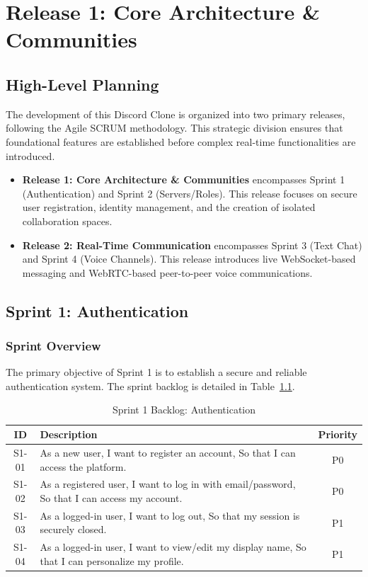 \chapter{Release 1: Core Architecture \& Communities}

\section*{High-Level Planning}
The development of this Discord Clone is organized into two primary releases, following the Agile SCRUM methodology. This strategic division ensures that foundational features are established before complex real-time functionalities are introduced. 
\begin{itemize}
    \item \textbf{Release 1: Core Architecture \& Communities} encompasses Sprint 1 (Authentication) and Sprint 2 (Servers/Roles). This release focuses on secure user registration, identity management, and the creation of isolated collaboration spaces.
    \item \textbf{Release 2: Real-Time Communication} encompasses Sprint 3 (Text Chat) and Sprint 4 (Voice Channels). This release introduces live WebSocket-based messaging and WebRTC-based peer-to-peer voice communications.
\end{itemize}

\section{Sprint 1: Authentication}

\subsection{Sprint Overview}
The primary objective of Sprint 1 is to establish a secure and reliable authentication system. The sprint backlog is detailed in Table~\ref{tab:sprint1_backlog}.

\begin{table}[H]
    \centering
    \begin{tabular}{|c|p{10cm}|c|}
        \hline
        \textbf{ID} & \textbf{Description} & \textbf{Priority} \\
        \hline
        S1-01 & As a new user, I want to register an account, So that I can access the platform. & P0 \\
        \hline
        S1-02 & As a registered user, I want to log in with email/password, So that I can access my account. & P0 \\
        \hline
        S1-03 & As a logged-in user, I want to log out, So that my session is securely closed. & P1 \\
        \hline
        S1-04 & As a logged-in user, I want to view/edit my display name, So that I can personalize my profile. & P1 \\
        \hline
    \end{tabular}
    \caption{Sprint 1 Backlog: Authentication}
    \label{tab:sprint1_backlog}
\end{table}

